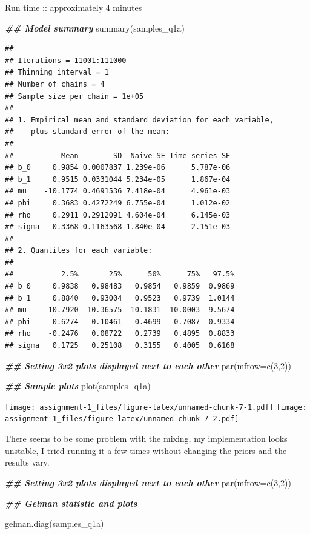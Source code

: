 \documentclass[
]{article}
\newenvironment{Shaded}{\begin{snugshade}}{\end{snugshade}}
\newcommand{\AttributeTok}[1]{\textcolor[rgb]{0.77,0.63,0.00}{#1}}
\newcommand{\DecValTok}[1]{\textcolor[rgb]{0.00,0.00,0.81}{#1}}
\newcommand{\DocumentationTok}[1]{\textcolor[rgb]{0.56,0.35,0.01}{\textbf{\textit{#1}}}}
\newcommand{\FunctionTok}[1]{\textcolor[rgb]{0.00,0.00,0.00}{#1}}
\newcommand{\NormalTok}[1]{#1}
\begin{document}
Run time :: approximately 4 minutes

\begin{Shaded}
\begin{Highlighting}[]
\DocumentationTok{\#\# Model summary}
\FunctionTok{summary}\NormalTok{(samples\_q1a)}
\end{Highlighting}
\end{Shaded}

\begin{verbatim}
## 
## Iterations = 11001:111000
## Thinning interval = 1 
## Number of chains = 4 
## Sample size per chain = 1e+05 
## 
## 1. Empirical mean and standard deviation for each variable,
##    plus standard error of the mean:
## 
##           Mean        SD  Naive SE Time-series SE
## b_0     0.9854 0.0007837 1.239e-06      5.787e-06
## b_1     0.9515 0.0331044 5.234e-05      1.867e-04
## mu    -10.1774 0.4691536 7.418e-04      4.961e-03
## phi     0.3683 0.4272249 6.755e-04      1.012e-02
## rho     0.2911 0.2912091 4.604e-04      6.145e-03
## sigma   0.3368 0.1163568 1.840e-04      2.151e-03
## 
## 2. Quantiles for each variable:
## 
##           2.5%       25%      50%      75%   97.5%
## b_0     0.9838   0.98483   0.9854   0.9859  0.9869
## b_1     0.8840   0.93004   0.9523   0.9739  1.0144
## mu    -10.7920 -10.36575 -10.1831 -10.0003 -9.5674
## phi    -0.6274   0.10461   0.4699   0.7087  0.9334
## rho    -0.2476   0.08722   0.2739   0.4895  0.8833
## sigma   0.1725   0.25108   0.3155   0.4005  0.6168
\end{verbatim}

\begin{Shaded}
\begin{Highlighting}[]
\DocumentationTok{\#\# Setting 3x2 plots displayed next to each other}
\FunctionTok{par}\NormalTok{(}\AttributeTok{mfrow=}\FunctionTok{c}\NormalTok{(}\DecValTok{3}\NormalTok{,}\DecValTok{2}\NormalTok{))}

\DocumentationTok{\#\# Sample plots}
\FunctionTok{plot}\NormalTok{(samples\_q1a)}
\end{Highlighting}
\end{Shaded}

\texttt{[image: assignment-1\_files/figure-latex/unnamed-chunk-7-1.pdf]}
\texttt{[image: assignment-1\_files/figure-latex/unnamed-chunk-7-2.pdf]}

There seems to be some problem with the mixing, my implementation looks
unstable, I tried running it a few times without changing the priors and
the results vary.

\begin{Shaded}
\begin{Highlighting}[]
\DocumentationTok{\#\# Setting 3x2 plots displayed next to each other}
\FunctionTok{par}\NormalTok{(}\AttributeTok{mfrow=}\FunctionTok{c}\NormalTok{(}\DecValTok{3}\NormalTok{,}\DecValTok{2}\NormalTok{))}

\DocumentationTok{\#\# Gelman statistic and plots}

\FunctionTok{gelman.diag}\NormalTok{(samples\_q1a)}
\end{Highlighting}
\end{Shaded}
\end{document}
